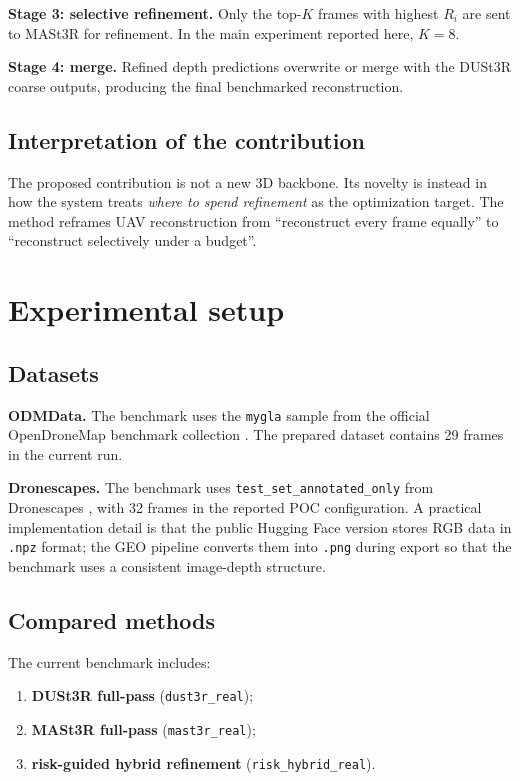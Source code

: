 \documentclass[preprint,12pt]{elsarticle}
\begin{document}
\textbf{Stage 3: selective refinement.}
Only the top-$K$ frames with highest $R_i$ are sent to MASt3R for refinement. In the main experiment reported here, $K=8$.

\textbf{Stage 4: merge.}
Refined depth predictions overwrite or merge with the DUSt3R coarse outputs, producing the final benchmarked reconstruction.

\subsection{Interpretation of the contribution}

The proposed contribution is not a new 3D backbone. Its novelty is instead in how the system treats \textit{where to spend refinement} as the optimization target. The method reframes UAV reconstruction from ``reconstruct every frame equally'' to ``reconstruct selectively under a budget''.

\section{Experimental setup}

\subsection{Datasets}

\textbf{ODMData.} The benchmark uses the \texttt{mygla} sample from the official OpenDroneMap benchmark collection \citep{ODMDataBenchmarks}. The prepared dataset contains 29 frames in the current run.

\textbf{Dronescapes.} The benchmark uses \texttt{test\_set\_annotated\_only} from Dronescapes \citep{DronescapesDataset}, with 32 frames in the reported POC configuration. A practical implementation detail is that the public Hugging Face version stores RGB data in \texttt{.npz} format; the GEO pipeline converts them into \texttt{.png} during export so that the benchmark uses a consistent image-depth structure.

\subsection{Compared methods}

The current benchmark includes:
\begin{enumerate}[leftmargin=1.5em]
  \item \textbf{DUSt3R full-pass} (\texttt{dust3r\_real});
  \item \textbf{MASt3R full-pass} (\texttt{mast3r\_real});
  \item \textbf{risk-guided hybrid refinement} (\texttt{risk\_hybrid\_real}).
\end{enumerate}
\end{document}
